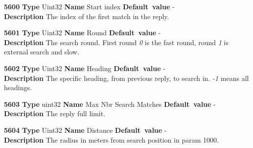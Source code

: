 \documentclass[a4paper]{article}
\begin{document}
\begin{list}{\textbf{ParamID}}{}
\item \textbf{5600} \textbf{Type} Uint32 \textbf{Name} Start index
                 \textbf{Default~value} - \\
  \label{combined_search_req:Start_Index}
  \textbf{Description} The index of the first match in the reply.
\item \textbf{5601} \textbf{Type} Uint32 \textbf{Name} Round
                 \textbf{Default~value} - \\
  \label{combined_search_req:Round}
  \textbf{Description} The search round. First round \emph{0} is the fast 
  round, round \emph{1} is external search and slow.
\item \textbf{5602} \textbf{Type} Uint32 \textbf{Name} Heading
                 \textbf{Default~value} - \\
  \label{combined_search_req:Heading}
  \textbf{Description} The specific heading, from previous reply, to search
  in. \emph{-1} means all headings.
\item \textbf{5603} \textbf{Type} uint32 \textbf{Name} Max Nbr Search Matches
                 \textbf{Default~value} - \\
  \label{Max Nbr Search Matches Combined search}
  \textbf{Description} The reply full limit.
\item \textbf{5604} \textbf{Type} Uint32 \textbf{Name} Distance
                 \textbf{Default~value} - \\
  \label{combined_search_req:Distance}
  \textbf{Description} The radius in meters from search position in param 1000.
\end{list}
\end{document}
